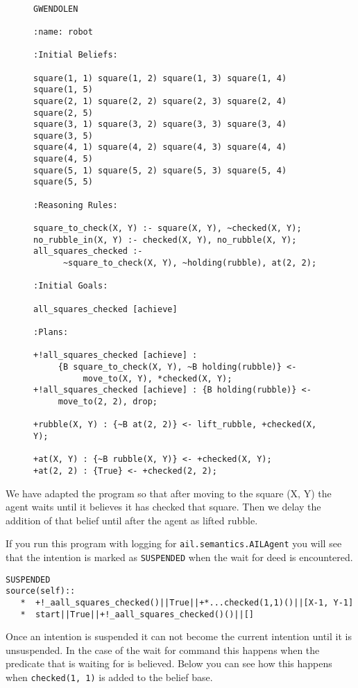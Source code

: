 \begin{figure}[!htb]
\begin{ourexample}
\label{code:pickuprubble_waitfor} \quad \\
\begin{lstlisting}[basicstyle=\sffamily,style=easslisting,language=Gwendolen]
GWENDOLEN

:name: robot

:Initial Beliefs:

square(1, 1) square(1, 2) square(1, 3) square(1, 4) square(1, 5)
square(2, 1) square(2, 2) square(2, 3) square(2, 4) square(2, 5)
square(3, 1) square(3, 2) square(3, 3) square(3, 4) square(3, 5)
square(4, 1) square(4, 2) square(4, 3) square(4, 4) square(4, 5)
square(5, 1) square(5, 2) square(5, 3) square(5, 4) square(5, 5)

:Reasoning Rules:

square_to_check(X, Y) :- square(X, Y), ~checked(X, Y);
no_rubble_in(X, Y) :- checked(X, Y), no_rubble(X, Y);
all_squares_checked :-
      ~square_to_check(X, Y), ~holding(rubble), at(2, 2);

:Initial Goals:

all_squares_checked [achieve]

:Plans:

+!all_squares_checked [achieve] : 
     {B square_to_check(X, Y), ~B holding(rubble)} <- 
          move_to(X, Y), *checked(X, Y);
+!all_squares_checked [achieve] : {B holding(rubble)} <- 
     move_to(2, 2), drop;

+rubble(X, Y) : {~B at(2, 2)} <- lift_rubble, +checked(X, Y);

+at(X, Y) : {~B rubble(X, Y)} <- +checked(X, Y);
+at(2, 2) : {True} <- +checked(2, 2);
\end{lstlisting}
\end{ourexample}
\end{figure}
We have adapted the program so that after moving to the square (X, Y)
the agent waits until it believes it has checked that square.  Then we
delay the addition of that belief until after the agent as lifted
rubble. 

If you run this program with logging for
\texttt{ail.semantics.AILAgent} you will see that the intention is marked as
\texttt{SUSPENDED} when the wait for deed is
encountered. 
\begin{verbatim}
SUSPENDED
source(self):: 
   *  +!_aall_squares_checked()||True||+*...checked(1,1)()||[X-1, Y-1]
   *  start||True||+!_aall_squares_checked()()||[]
\end{verbatim}
Once an intention is suspended it can not become the current intention until it is unsuspended.  In the case of the wait for command this happens when the predicate that is waiting for is believed.  Below you can see how this happens when \texttt{checked(1, 1)} is added to the belief base.

